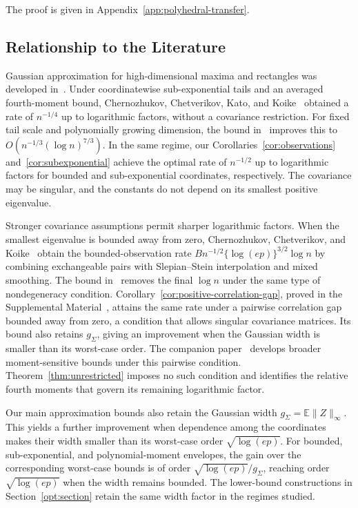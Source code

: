 \documentclass[11pt,letterpaper,twoside,leqno]{article}
\theoremstyle{bookplain}
\theoremstyle{bookremark}
\newcommand{\E}{\mathbb E}
\begin{document}
{
The proof is given in Appendix~\ref{app:polyhedral-transfer}.
}


\subsection{Relationship to the Literature}\label{sec:literature}

Gaussian approximation for high-dimensional maxima and rectangles was
developed in~\cite{CCK2013,CCK2017}. Under coordinatewise sub-exponential
tails and an averaged fourth-moment bound, Chernozhukov, Chetverikov,
Kato, and Koike~\cite[Theorem~2.1]{CCKK2022} obtained a rate of
\(n^{-1/4}\) up to logarithmic factors, without a covariance restriction.
For fixed tail scale and polynomially growing dimension, the bound
in~\cite[Theorem~1]{GaoZhang} improves this to
\(O(n^{-1/3}(\log n)^{7/3})\). In the same regime, our
Corollaries~\ref{cor:observations} and~\ref{cor:subexponential}
achieve the optimal rate of \(n^{-1/2}\) up to logarithmic factors
for bounded and sub-exponential coordinates, respectively.
The covariance may be singular, and the constants do not depend on
its smallest positive eigenvalue.

Stronger covariance assumptions permit sharper logarithmic factors.
When the smallest eigenvalue is bounded away from zero,
Chernozhukov, Chetverikov, and Koike~\cite{CCK} obtain the
bounded-observation rate \(Bn^{-1/2}\{\log(ep)\}^{3/2}\log n\)
by combining exchangeable pairs with Slepian--Stein interpolation
and mixed smoothing. The bound in~\cite{AL} removes the final
\(\log n\) under the same type of nondegeneracy condition.
Corollary~\ref{cor:positive-correlation-gap}, proved in
the Supplemental Material~\cite[Appendix~H]{Supplement2026}, attains the same rate under a
pairwise correlation gap bounded away from zero, a condition that allows
singular covariance matrices. Its bound also retains $g_\Sigma$, giving
an improvement when the Gaussian width is smaller than its worst-case
order. The companion paper~\cite{CorrelationGap} develops broader
moment-sensitive bounds under this pairwise condition.
Theorem~\ref{thm:unrestricted} imposes no such condition and identifies
the relative fourth moments that govern its remaining logarithmic factor.

Our main approximation bounds also retain the Gaussian width
\(g_\Sigma=\E\|Z\|_\infty\). This yields a further improvement
when dependence among the coordinates makes their width smaller
than its worst-case order \(\sqrt{\log(ep)}\). For bounded,
sub-exponential, and polynomial-moment envelopes, the gain over
the corresponding worst-case bounds is of order
\(\sqrt{\log(ep)}/g_\Sigma\), reaching order
\(\sqrt{\log(ep)}\) when the width remains bounded.
The lower-bound constructions in Section~\ref{opt:section}
retain the same width factor in the regimes studied.
\end{document}
